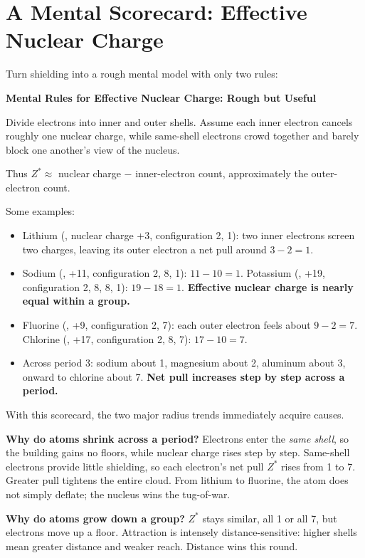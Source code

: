 \section{A Mental Scorecard: Effective Nuclear Charge}

Turn shielding into a rough mental model with only two rules:

\begin{qiaoliang}
\textbf{Mental Rules for Effective Nuclear Charge: Rough but Useful}

Divide electrons into inner and outer shells. Assume each inner electron cancels roughly one nuclear charge, while same-shell electrons crowd together and barely block one another's view of the nucleus.

Thus $Z^{*} \approx$ nuclear charge $-$ inner-electron count, approximately the outer-electron count.

Some examples:
\begin{itemize}[itemsep=1pt]
\item Lithium (, nuclear charge +3, configuration 2, 1): two inner electrons screen two charges, leaving its outer electron a net pull around $3-2=1$.
\item Sodium (, +11, configuration 2, 8, 1): $11-10=1$. Potassium (, +19, configuration 2, 8, 8, 1): $19-18=1$. \textbf{Effective nuclear charge is nearly equal within a group.}
\item Fluorine (, +9, configuration 2, 7): each outer electron feels about $9-2=7$. Chlorine (, +17, configuration 2, 8, 7): $17-10=7$.
\item Across period 3: sodium about 1, magnesium about 2, aluminum about 3, onward to chlorine about 7. \textbf{Net pull increases step by step across a period.}
\end{itemize}
\end{qiaoliang}

With this scorecard, the two major radius trends immediately acquire causes.

\textbf{Why do atoms shrink across a period?} Electrons enter the \emph{same shell}, so the building gains no floors, while nuclear charge rises step by step. Same-shell electrons provide little shielding, so each electron's net pull $Z^{*}$ rises from 1 to 7. Greater pull tightens the entire cloud. From lithium to fluorine, the atom does not simply deflate; the nucleus wins the tug-of-war.

\textbf{Why do atoms grow down a group?} $Z^{*}$ stays similar, all 1 or all 7, but electrons move up a floor. Attraction is intensely distance-sensitive: higher shells mean greater distance and weaker reach. Distance wins this round.

